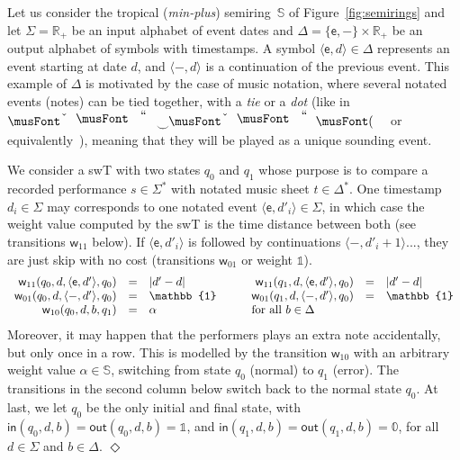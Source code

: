 \documentclass[runningheads]{llncs}
\def\endex{\hspace*{\fill} $\Diamond$\smallskip }
{\theorembodyfont{\rmfamily} \theoremstyle{break} \newtheorem{algo}{Algorithm}}
\def\<#1>{\langle #1 \rangle}
\newcommand{\Semiring}{\mathbb{S}}
\newcommand{\zero}{\mathbb{0}}
\newcommand{\one}{\mathbb{1}}
\def\SWT{\textsf{swT}\xspace}
\def\wei{\mathsf{w}}
\def\init{\mathsf{in}}
\def\final{\mathsf{out}}
\begin{document}
\begin{example}
Let us consider the tropical (\emph{min-plus}) semiring~$\Semiring$ 
of Figure~\ref{fig:semirings} and 
let $\Sigma = \mathbb{R}_+$ be an input alphabet of event dates
and $\Delta = \{ \mathsf{e}, \mathsf{-} \} \times \mathbb{R}_+$ 
be an output alphabet of symbols with timestamps. 
A symbol $\< \mathsf{e}, d > \in \Delta$ represents an event starting at date $d$, 
and $\< \mathsf{-}, d >$ is a continuation of the previous event.
This example of $\Delta$ is motivated by the case of music notation, 
where several notated events (notes) can be tied together, 
with a \emph{tie} or a \emph{dot}
(like in $\musQuarter\!\!\mathrel{\raisebox{-1.5mm}{$\smile$}}\!\!\musEighth$ 
 or equivalently~\musQuarterDotted),
meaning that they will be played as a unique sounding event.

We consider a \SWT with two states $q_0$ and $q_1$ whose purpose 
is to compare a recorded performance $s \in \Sigma^*$
with notated music sheet $t \in \Delta^*$.
One timestamp $d_i \in \Sigma$ may corresponds 
to one notated event $\<\mathsf{e}, d'_i> \in \Sigma$, in which case 
the weight value computed by the \SWT is the time distance between both
(see transitions $\wei_{11}$ below).
%
If $\<\mathsf{e}, d'_i>$ is followed by continuations 
$\<\mathsf{-}, d'_{i+1}>$..., they are just skip with no cost (transitions $\wei_{01}$ or weight $\one$).
\[
\begin{array}{rclcrcl}
\wei_{11}(q_0, d, \< \mathsf{e}, d'>, q_0) & = & |d' - d| & \quad &
\wei_{11}(q_1, d, \< \mathsf{e}, d'>, q_0) & = & |d' - d|\\
\wei_{01}(q_0, d, \< \mathsf{-}, d'>, q_0) & = & \one & &
\wei_{01}(q_1, d, \< \mathsf{-}, d'>, q_0) & = & \one\\
\wei_{10}(q_0, d, b, q_1) & = & \alpha & & \multicolumn{3}{l}{\mathrm{for~all~} b \in \Delta}
\end{array}
\]
%
Moreover, it may happen that the performers plays an extra note accidentally, but only once in a row. 
This is modelled by the transition $\wei_{10}$ with an arbitrary weight value $\alpha \in \Semiring$, 
switching from state $q_0$ (normal) to $q_1$ (error).
The transitions in the second column below switch back to the normal state $q_0$.
At last, we let $q_0$ be the only initial and final state, with
$\init(q_0, d, b) = \final(q_0, d, b) = \one$, and 
$\init(q_1, d, b) = \final(q_1, d, b) = \zero$, 
for all $d \in \Sigma$ and $b \in \Delta$.
\endex
\end{example}
\end{document}
